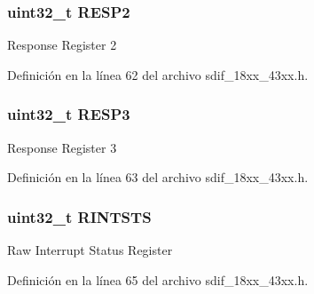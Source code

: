\subsubsection[{\texorpdfstring{R\+E\+S\+P2}{RESP2}}]{ uint32\+\_\+t R\+E\+S\+P2}\hypertarget{struct_l_p_c___s_d_m_m_c___t_a4d99c78dffdb6e81e8f6b7abec263419}{}\label{struct_l_p_c___s_d_m_m_c___t_a4d99c78dffdb6e81e8f6b7abec263419}
Response Register 2 

Definición en la línea 62 del archivo sdif\+\_\+18xx\+\_\+43xx.\+h.

\subsubsection[{\texorpdfstring{R\+E\+S\+P3}{RESP3}}]{ uint32\+\_\+t R\+E\+S\+P3}\hypertarget{struct_l_p_c___s_d_m_m_c___t_a3da04fbdd44f48a1840e5e0a6295f3cf}{}\label{struct_l_p_c___s_d_m_m_c___t_a3da04fbdd44f48a1840e5e0a6295f3cf}
Response Register 3 

Definición en la línea 63 del archivo sdif\+\_\+18xx\+\_\+43xx.\+h.

\subsubsection[{\texorpdfstring{R\+I\+N\+T\+S\+TS}{RINTSTS}}]{ uint32\+\_\+t R\+I\+N\+T\+S\+TS}\hypertarget{struct_l_p_c___s_d_m_m_c___t_a46ea540b0dd0869512ba83c0fbb99765}{}\label{struct_l_p_c___s_d_m_m_c___t_a46ea540b0dd0869512ba83c0fbb99765}
Raw Interrupt Status Register 

Definición en la línea 65 del archivo sdif\+\_\+18xx\+\_\+43xx.\+h.

